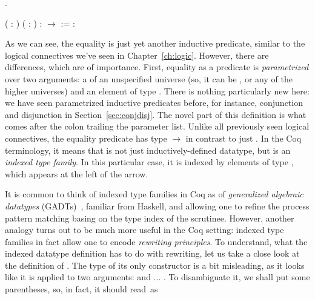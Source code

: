 \coqdocemptyline
\begin{coqdoccode}
\coqdocemptyline
\coqdocnoindent
{} .\coqdoceol
\coqdocemptyline
\end{coqdoccode}
\coqdoceol
\coqdocemptyline
\coqdocnoindent
{}  ( : ) ( : ) :  \ensuremath{\rightarrow}  :=   :   

\coqdocemptyline




As we can see, the equality is just yet another inductive predicate,
similar to the logical connectives we've seen in
Chapter~\ref{ch:logic}. However, there are differences, which are of
importance. First, equality as a predicate is \textit{parametrized}
 over two arguments: a   of an
unspecified universe (so, it can be ,  or any of the higher
universes) and an element  of type . There is nothing
particularly new here: we have seen parametrized inductive predicates
before, for instance, conjunction and disjunction in
Section~\ref{sec:conjdisj}. The novel part of this definition is
what comes after the colon trailing the parameter list. Unlike all
previously seen logical connectives, the equality predicate has type
 \ensuremath{\rightarrow}  in contrast to just . In the Coq terminology, it
means that  is not just inductively-defined datatype, but is an
\textit{indexed type family}. In this
particular case, it is indexed  by elements
of type , which appears at the left of the arrow.




It is common to think of
indexed type families in Coq as of \textit{generalized algebraic datatypes}
(GADTs)~\cite{PeytonJones-al:ICFP06,Xi-al:POPL03}, familiar from
 Haskell, and allowing one to refine the process
pattern matching basing on the type index of the scrutinee. However,
another analogy turns out to be much more useful in the Coq setting:
indexed type families in fact allow one to encode \textit{rewriting
principles}. To understand, what the indexed datatype definition has
to do with rewriting, let us take a close look at the definition of
. The type of its only constructor  is a bit misleading,
as it looks like it is applied to two arguments:  and ... . To
disambiguate it, we shall put some parentheses, so, in fact, it should
read~as


